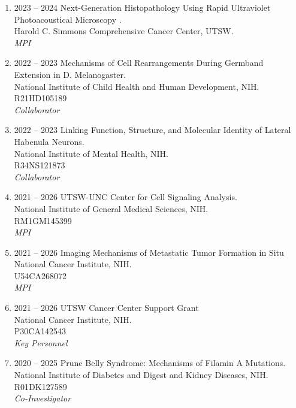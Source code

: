 \documentclass[10pt]{res}
\begin{document}
\begin{resume}
\begin{enumerate}
\item 2023 -- 2024 
\hspace{8pt}
Next-Generation Histopathology Using Rapid Ultraviolet Photoacoustical Microscopy . \\
Harold C. Simmons Comprehensive Cancer Center, UTSW. \\
{\it MPI}

\item 2022 -- 2023 
\hspace{8pt}
Mechanisms of Cell Rearrangements During Germband Extension in D. Melanogaster.\\
National Institute of Child Health and Human Development, NIH. \\
R21HD105189 \\
{\it Collaborator}

\item 2022 -- 2023 
\hspace{8pt}
Linking Function, Structure, and Molecular Identity of Lateral Habenula Neurons. \\
National Institute of Mental Health, NIH. \\
R34NS121873 \\
{\it Collaborator}

\item 2021 -- 2026 
\hspace{8pt}
UTSW-UNC Center for Cell Signaling Analysis. \\
National Institute of General Medical Sciences, NIH. \\
RM1GM145399 \\ 
{\it MPI}

\item 2021 -- 2026 
\hspace{8pt}
Imaging Mechanisms of Metastatic Tumor Formation in Situ \\
National Cancer Institute, NIH. \\
U54CA268072 \\ 
{\it MPI}

\item 2021 -- 2026 
\hspace{8pt}
UTSW Cancer Center Support Grant \\
National Cancer Institute, NIH. \\
P30CA142543 \\ 
{\it Key Personnel}

\item 2020 -- 2025 
\hspace{8pt} 
Prune Belly Syndrome: Mechanisms of Filamin A Mutations. \\
National Institute of Diabetes and Digest and Kidney Diseases, NIH. \\
R01DK127589 \\
{\it Co-Investigator} 


\end{enumerate}
\end{resume}
\end{document}
